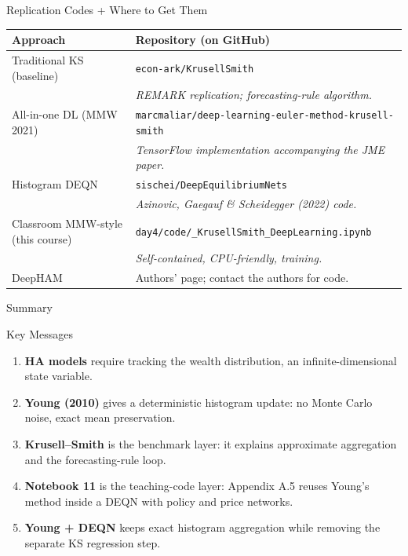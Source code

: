\documentclass[aspectratio=169,11pt]{beamer}
\begin{document}
\begin{frame}{Replication Codes + Where to Get Them}
\scriptsize
\begin{center}
\begin{tabular}{p{3.3cm} p{7.5cm}}
\toprule
\textbf{Approach} & \textbf{Repository (on GitHub)} \\
\midrule
Traditional KS (baseline) & \texttt{econ-ark/KrusellSmith} \\
& \quad\emph{REMARK replication; forecasting-rule algorithm.} \\
\addlinespace
All-in-one DL (MMW 2021) & \texttt{marcmaliar/deep-learning-\allowbreak euler-method-\allowbreak krusell-smith} \\
& \quad\emph{TensorFlow implementation accompanying the JME paper.} \\
\addlinespace
Histogram DEQN & \texttt{sischei/DeepEquilibriumNets} \\
& \quad\emph{Azinovic, Gaegauf \& Scheidegger (2022) code.} \\
\addlinespace
Classroom MMW-style (this course) & \texttt{day4/code/\allowbreak 12\_KrusellSmith\_\allowbreak DeepLearning.ipynb} \\
& \quad\emph{Self-contained, CPU-friendly,  training.} \\
\addlinespace
DeepHAM & Authors' page; contact the authors for code. \\
\bottomrule
\end{tabular}
\end{center}
\end{frame}


\begin{frame}{Summary}
\scriptsize
\begin{block}{Key Messages}
\begin{enumerate}
    \item \textbf{HA models} require tracking the wealth distribution, an infinite-dimensional state variable.
    \item \textbf{Young (2010)} gives a deterministic histogram update: no Monte Carlo noise, exact mean preservation.
    \item \textbf{Krusell--Smith} is the benchmark layer: it explains approximate aggregation and the forecasting-rule loop.
    \item \textbf{Notebook 11} is the teaching-code layer: Appendix A.5 reuses Young's method inside a DEQN with policy and price networks.
    \item \textbf{Young + DEQN} keeps exact histogram aggregation while removing the separate KS regression step.
\end{enumerate}
\end{block}
\end{frame}
\end{document}
